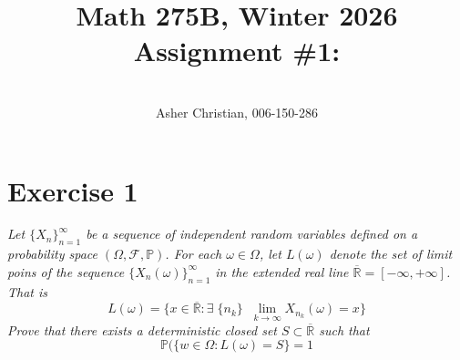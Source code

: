 \documentclass[11pt]{article}
\newcommand{\cnum}{Math 275B}
\newcommand{\ced}{Winter 2026}
\newcommand{\ctitle}[4]{\title{\vspace{-0.5in}\cnum, \ced\\Assignment #1: #2}\author{\vspace{-0.35in}\\#3, #4}}
\begin{document}
\ctitle{\#1}{}{Asher Christian}{006-150-286}
\date{}
\maketitle

\section{Exercise 1}
\emph{
    Let $\{X_n\}_{n=1}^{\infty}$ be a sequence of independent random variables defined on a probability space $(\Omega, \mathcal{F}, \mathbb{P})$. For each $\omega \in \Omega$, let  $L(\omega)$ denote
    the set of limit poins of the sequence  $\{X_n(\omega)\}_{n=1}^{\infty}$ in the extended real line $ \overline{ \mathbb{R}} = [-\infty, +\infty]$. That is
    \[
        L(\omega) = \{x \in \overline{ \mathbb{R}}: \exists \; \{n_k\} \;\; \lim_{k\to \infty} X_{n_k}(\omega) = x\}
    \] 
    Prove that there exists a deterministic closed set $S \subset \overline{ \mathbb{R}}$ such that
    \[
        \mathbb{P}(\{w \in \Omega: L(\omega) = S\} = 1
    \] 
}
\end{document}
